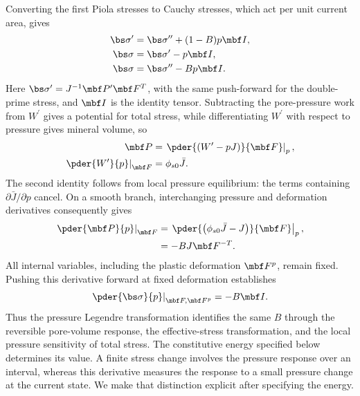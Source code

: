 Converting the first Piola stresses to Cauchy stresses, which act per unit
current area, gives
\begin{align}
 \bs\sigma^{\prime}
 &=\bs\sigma^{\prime\prime}+(1-B)p\mbf I,
 \label{eq:single-double-prime-stress-relation}\\
 \bs\sigma
 &=\bs\sigma^{\prime}-p\mbf I,
 \label{eq:total-cauchy-single-prime}\\
 \bs\sigma
 &=\bs\sigma^{\prime\prime}-Bp\mbf I.
 \label{eq:total-cauchy-stress}
\end{align}
Here \(\bs\sigma^{\prime}=J^{-1}\mbf P^{\prime}\mbf F^T\), with the same
push-forward for the double-prime stress, and \(\mbf I\) is the identity
tensor.  Subtracting the pore-pressure work from \(W^{\prime}\) gives a
potential for total stress, while differentiating \(W^{\prime}\) with
respect to pressure gives mineral volume, so
\begin{align*}
 \mbf P
 &=\left.\pder{\left(W^{\prime}-pJ\right)}{\mbf F}\right|_p,
\\
 \left.\pder{W^{\prime}}{p}\right|_{\mbf F}
 &=\phi_{s0}\bar J.
\end{align*}
The second identity follows from local pressure equilibrium: the terms
containing \(\partial\bar J/\partial p\) cancel.  On a smooth branch,
interchanging pressure and deformation derivatives consequently gives
\begin{align*}
 \left.\pder{\mbf P}{p}\right|_{\mbf F}
 &=\left.\pder{\left(\phi_{s0}\bar J-J\right)}{\mbf F}\right|_p,
\\
 &=-BJ\mbf F^{-T}.
\end{align*}
All internal variables, including the plastic deformation \(\mbf F^p\),
remain fixed.  Pushing this derivative forward at
fixed deformation establishes
\begin{equation}
 \left.\pder{\bs\sigma}{p}\right|_{\mbf F,\mbf F^p}
 =-B\mbf I.
 \label{eq:total-stress-pressure-tangent}
\end{equation}
Thus the pressure Legendre transformation identifies the same \(B\) through
the reversible pore-volume response, the effective-stress transformation,
and the local pressure sensitivity of total stress.  The constitutive
energy specified below determines its value.  A finite
stress change involves the pressure response over an interval, whereas this
derivative measures the response to a small pressure change at the current
state.  We make that distinction explicit after specifying the energy.


